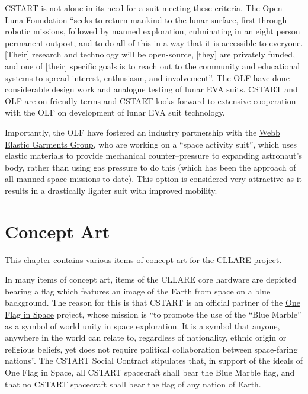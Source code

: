 \documentclass{report}
\begin{document}
CSTART is not alone in its need for a suit meeting these criteria.  The \href{http://www.openluna.org/}{Open Luna Foundation} ``seeks to return mankind to the lunar surface, first through robotic missions, followed by manned exploration, culminating in an eight person permanent outpost, and to do all of this in a way that it is accessible to everyone. [Their] research and technology will be open-source, [they] are privately funded, and one of [their] specific goals is to reach out to the community and educational systems to spread interest, enthusiasm, and involvement''.  The OLF have done considerable design work and analogue testing of lunar EVA suits.  CSTART and OLF are on friendly terms and CSTART looks forward to extensive cooperation with the OLF on development of lunar EVA suit technology.

Importantly, the OLF have fostered an industry partnership with the \href{http://www.elasticspacesuit.com/}{Webb Elastic Garments Group}, who are working on a ``space activity suit'', which uses elastic materials to provide mechanical counter--pressure to expanding astronaut's body, rather than using gas pressure to do this (which has been the approach of all manned space missions to date).  This option is considered very attractive as it results in a drastically lighter suit with improved mobility.

\chapter{Concept Art}

This chapter contains various items of concept art for the CLLARE project.

In many items of concept art, items of the CLLARE core hardware are depicted bearing a flag which features an image of the Earth from space on a blue background.  The reason for this is that CSTART is an official partner of the \href{http://www.oneflaginspace.org}{One Flag in Space} project, whose mission is ``to promote the use of the ``Blue Marble'' as a symbol of world unity in space exploration. It is a symbol that anyone, anywhere in the world can relate to, regardless of nationality, ethnic origin or religious beliefs, yet does not require political collaboration between space-faring nations''.  The CSTART Social Contract stipulates that, in support of the ideals of One Flag in Space, all CSTART spacecraft shall bear the Blue Marble flag, and that no CSTART spacecraft shall bear the flag of any nation of Earth.
\end{document}
